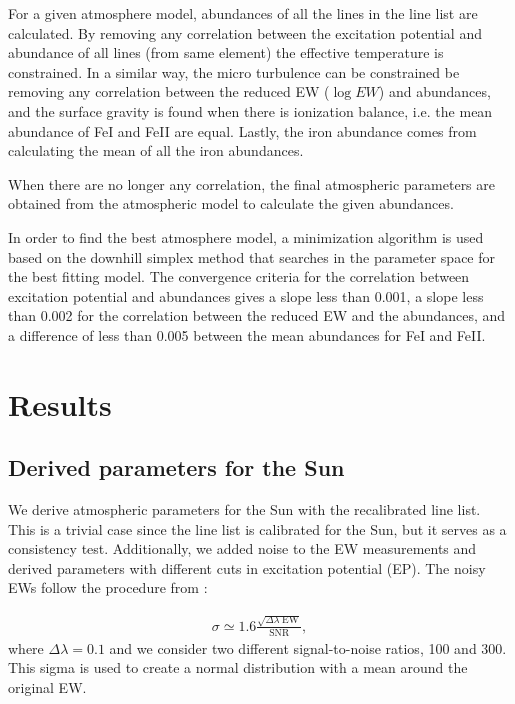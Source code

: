 \documentclass{aa}
\begin{document}
For a given atmosphere model, abundances of all the lines in the line
list are calculated. By removing any correlation between the excitation
potential and abundance of all lines (from same element) the effective
temperature is constrained. In a similar way, the micro turbulence can
be constrained be removing any correlation between the reduced EW ($\log
EW$) and abundances, and the surface gravity is found when there is
ionization balance, i.e. the mean abundance of FeI and FeII are equal.
Lastly, the iron abundance comes from calculating the mean of
all the iron abundances.

When there are no longer any correlation, the final atmospheric
parameters are obtained from the atmospheric model to calculate the
given abundances.

In order to find the best atmosphere model, a minimization algorithm
is used based on the downhill simplex method \citep{Press1992} that
searches in the parameter space for the best fitting model. The
convergence criteria for the correlation between excitation potential
and abundances gives a slope less than 0.001, a slope less than 0.002
for the correlation between the reduced EW and the abundances, and a
difference of less than 0.005 between the mean abundances for FeI and
FeII.







\section{Results}
\label{sec:results}


\subsection{Derived parameters for the Sun}
\label{sec:derived_parameters_of_the_sun}

We derive atmospheric parameters for the Sun with the recalibrated line
list. This is a trivial case since the line list is calibrated for the
Sun, but it serves as a consistency test. Additionally, we added noise
to the EW measurements and derived parameters with different cuts in
excitation potential (EP). The noisy EWs follow the procedure from
\cite{Caryel1988}:

\begin{align}
    \sigma \simeq 1.6 \frac{\sqrt{\Delta\lambda\; \mathrm{EW}}}{\mathrm{SNR}},
\end{align}
where $\Delta\lambda=0.1$ and we consider two different signal-to-noise
ratios, 100 and 300. This sigma is used to create a normal distribution
with a mean around the original EW.
\end{document}

